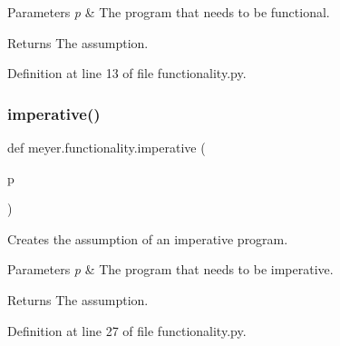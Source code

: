 \begin{DoxyParams}{Parameters}
{\em p} & The program that needs to be functional. \\
\hline
\end{DoxyParams}
\begin{DoxyReturn}{Returns}
The assumption. 
\end{DoxyReturn}


Definition at line 13 of file functionality.\+py.

\mbox{\label{namespacemeyer_1_1functionality_adfc257b0f6ee273de71eb1e3e7db1f3e}} 
\subsubsection{\texorpdfstring{imperative()}{imperative()}}
{\footnotesize\ttfamily def meyer.\+functionality.\+imperative (\begin{DoxyParamCaption}\item[{}]{p }\end{DoxyParamCaption})}



Creates the assumption of an imperative program. 


\begin{DoxyParams}{Parameters}
{\em p} & The program that needs to be imperative. \\
\hline
\end{DoxyParams}
\begin{DoxyReturn}{Returns}
The assumption. 
\end{DoxyReturn}


Definition at line 27 of file functionality.\+py.

